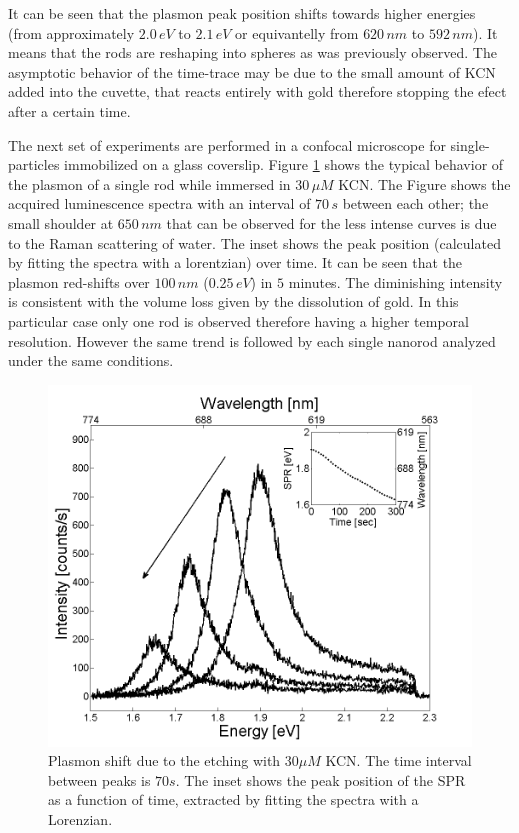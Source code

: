 \documentclass[twocolumn]{article}
\begin{document}
It can be seen that the plasmon peak position shifts towards higher energies
(from approximately $2.0\,eV$ to $2.1\,eV$ or equivantelly from $620\,nm$ to
$592\,nm$). It means that the rods are reshaping into spheres as was previously
observed\cite{janaanisotropic2002}. The asymptotic behavior of the time-trace
may be due to the small amount of KCN added into the cuvette, that reacts
entirely with gold therefore stopping the efect after a certain time.

The next set of experiments are performed in a confocal microscope for
single-particles immobilized on a glass coverslip. Figure
\ref{fig:plasmon_single_rod} shows the typical behavior of the plasmon of a
single rod while immersed in $30\,\mu M$ KCN. The Figure shows the acquired
luminescence spectra with an interval of $70\,s$ between each other; the small
shoulder at $650\,nm$ that can be observed for the less intense curves is due to
the Raman scattering of water. The inset shows the peak position (calculated by
fitting the spectra with a lorentzian) over time. It can be seen that the
plasmon red-shifts over $100\, nm$ ($0.25\, eV$) in $5$ minutes. The diminishing
intensity is consistent with the volume loss given by the dissolution of gold.
In this particular case only one rod is observed therefore having a higher
temporal resolution. However the same trend is followed by each single nanorod
analyzed under the same conditions.


\begin{figure}[hbt]
 \centering
 \includegraphics[width=0.95\linewidth]{plasmon_single_rod.png}
 \caption{Plasmon shift due to the etching with $30\mu M$ KCN. The time
 interval between peaks is $70s$. The inset shows the peak position of the SPR as a
 function of time, extracted by fitting the spectra with a Lorenzian.}
 \label{fig:plasmon_single_rod}
\end{figure}
\end{document}
